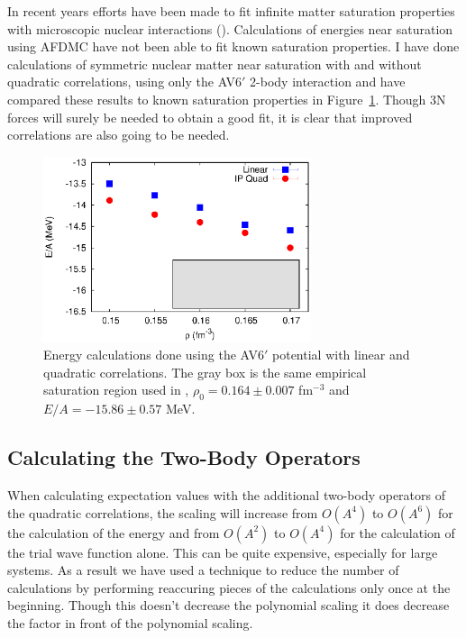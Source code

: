In recent years efforts have been made to fit infinite matter saturation properties with microscopic nuclear interactions (\cite{drischler2017}). Calculations of energies near saturation using AFDMC have not been able to fit known saturation properties. I have done calculations of symmetric nuclear matter near saturation with and without quadratic correlations, using only the AV6$'$ 2-body interaction and have compared these results to known saturation properties in Figure~\ref{fig:saturation}. Though 3N forces will surely be needed to obtain a good fit, it is clear that improved correlations are also going to be needed.
\begin{figure}[h!]
   \centering
   \includegraphics[width=0.7\textwidth]{figures/saturation.eps}
   \caption{Energy calculations done using the AV6$'$ potential with linear and quadratic correlations. The gray box is the same empirical saturation region used in \cite{drischler2017}, $\rho_0 = 0.164 \pm 0.007$ fm$^{-3}$ and $E/A=-15.86 \pm 0.57$ MeV.}
   \label{fig:saturation}
\end{figure}

\subsection{Calculating the Two-Body Operators}
When calculating expectation values with the additional two-body operators of the quadratic correlations, the scaling will increase from $O(A^4)$ to $O(A^6)$ for the calculation of the energy and from $O(A^2)$ to $O(A^4)$ for the calculation of the trial wave function alone. This can be quite expensive, especially for large systems. As a result we have used a technique to reduce the number of calculations by performing reaccuring pieces of the calculations only once at the beginning. Though this doesn't decrease the polynomial scaling it does decrease the factor in front of the polynomial scaling.

